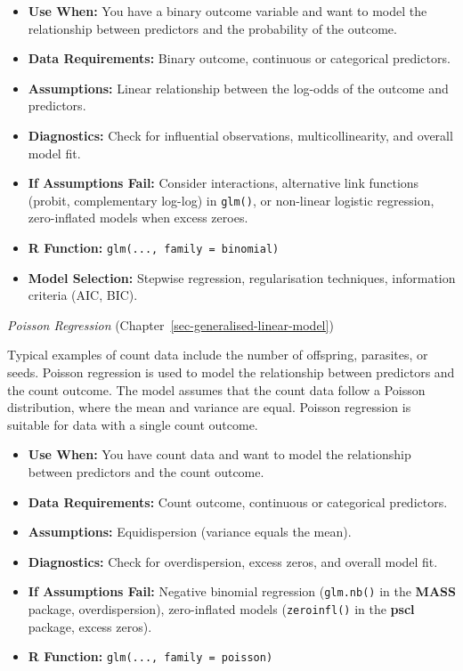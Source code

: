 \documentclass[
  letterpaper,
]{book}
\providecommand{\tightlist}{%
  \setlength{\itemsep}{0pt}\setlength{\parskip}{0pt}}\usepackage{longtable,booktabs,array}
\begin{document}
\begin{itemize}
\tightlist
\item
  \textbf{Use When:} You have a binary outcome variable and want to
  model the relationship between predictors and the probability of the
  outcome.
\item
  \textbf{Data Requirements:} Binary outcome, continuous or categorical
  predictors.
\item
  \textbf{Assumptions:} Linear relationship between the log-odds of the
  outcome and predictors.
\item
  \textbf{Diagnostics:} Check for influential observations,
  multicollinearity, and overall model fit.
\item
  \textbf{If Assumptions Fail:} Consider interactions, alternative link
  functions (probit, complementary log-log) in \texttt{glm()}, or
  non-linear logistic regression, zero-inflated models when excess
  zeroes.
\item
  \textbf{R Function:} \texttt{glm(...,\ family\ =\ binomial)}
\item
  \textbf{Model Selection:} Stepwise regression, regularisation
  techniques, information criteria (AIC, BIC).
\end{itemize}

\emph{Poisson Regression} (Chapter~\ref{sec-generalised-linear-model})

Typical examples of count data include the number of offspring,
parasites, or seeds. Poisson regression is used to model the
relationship between predictors and the count outcome. The model assumes
that the count data follow a Poisson distribution, where the mean and
variance are equal. Poisson regression is suitable for data with a
single count outcome.

\begin{itemize}
\tightlist
\item
  \textbf{Use When:} You have count data and want to model the
  relationship between predictors and the count outcome.
\item
  \textbf{Data Requirements:} Count outcome, continuous or categorical
  predictors.
\item
  \textbf{Assumptions:} Equidispersion (variance equals the mean).
\item
  \textbf{Diagnostics:} Check for overdispersion, excess zeros, and
  overall model fit.
\item
  \textbf{If Assumptions Fail:} Negative binomial regression
  (\texttt{glm.nb()} in the \textbf{MASS} package, overdispersion),
  zero-inflated models (\texttt{zeroinfl()} in the \textbf{pscl}
  package, excess zeros).
\item
  \textbf{R Function:} \texttt{glm(...,\ family\ =\ poisson)}
\end{itemize}
\end{document}
